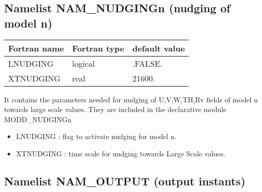 \subsection{Namelist NAM\_NUDGINGn (nudging of model n)}

\begin{center}
\begin{tabular} {|l|l|l|}
\hline
Fortran name & Fortran type & default value \\
\hline
LNUDGING   &  logical & .FALSE. \\
XTNUDGING  &  real    &  21600. \\
\hline
\end{tabular}
\end{center}

It contains the parameters needed for nudging of U,V,W,TH,Rv fields of model n
towards large scale values. They are
included in the declarative module MODD\_NUDGINGn
\begin{itemize}
\item
{}
LNUDGING : flag to activate nudging for model n.
\item
{}
XTNUDGING : time scale for nudging towards Large Scale values.
\end{itemize}

\subsection{Namelist NAM\_OUTPUT (output instants)}\label{s:namoutput}

